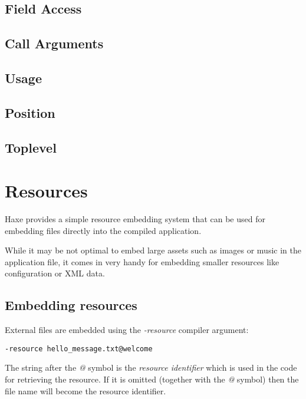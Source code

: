 \subsection{Field Access}
\label{cr-completion-field-access}

\subsection{Call Arguments}
\label{cr-completion-call-arguments}

\subsection{Usage}
\label{cr-completion-usage}

\subsection{Position}
\label{cr-completion-position}

\subsection{Toplevel}
\label{cr-completion-toplevel}

\section{Resources}
\label{cr-resources}

Haxe provides a simple resource embedding system that can be used for embedding files directly into the compiled application.

While it may be not optimal to embed large assets such as images or music in the application file, it comes in very handy for embedding smaller resources like configuration or XML data.

\subsection{Embedding resources}
\label{cr-resources-embed}

External files are embedded using the \emph{-resource} compiler argument:

\begin{lstlisting}
-resource hello_message.txt@welcome
\end{lstlisting}

The string after the \emph{@} symbol is the \emph{resource identifier} which is used in the code for retrieving the resource. If it is omitted (together with the \emph{@} symbol) then the file name will become the resource identifier.

